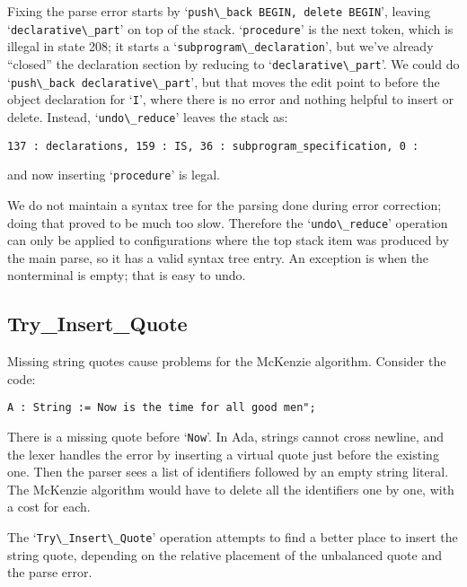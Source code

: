 \documentclass[authordraft]{acmart}
\newcommand{\code}[1]{`\lstinline|#1|'}
\begin{document}
Fixing the parse error starts by \code{push\_back BEGIN, delete BEGIN},
leaving \code{declarative\_part} on top of the stack. \code{procedure}
is the next token, which is illegal in state 208; it starts a
\code{subprogram\_declaration}, but we've already ``closed'' the
declaration section by reducing to \code{declarative\_part}. We could
do \code{push\_back declarative\_part}, but that moves the edit point to
before the object declaration for \code{I}, where there is no error
and nothing helpful to insert or delete. Instead, \code{undo\_reduce}
leaves the stack as:

\begin{verbatim}
137 : declarations, 159 : IS, 36 : subprogram_specification, 0 :
\end{verbatim}
and now inserting \code{procedure} is legal.

We do not maintain a syntax tree for the parsing done during error
correction; doing that proved to be much too slow. Therefore the
\code{undo\_reduce} operation can only be applied to configurations
where the top stack item was produced by the main parse, so it has a
valid syntax tree entry. An exception is when the nonterminal is
empty; that is easy to undo.

\subsection{Try\_Insert\_Quote}
Missing string quotes cause problems for the McKenzie algorithm.
Consider the code:
\begin{lstlisting}
A : String := Now is the time for all good men";
\end{lstlisting}
There is a missing quote before \code{Now}. In Ada, strings cannot
cross newline, and the lexer handles the error by inserting a virtual
quote just before the existing one. Then the parser sees a list of
identifiers followed by an empty string literal. The McKenzie
algorithm would have to delete all the identifiers one by one, with a
cost for each.

The \code{Try\_Insert\_Quote} operation attempts to find a better
place to insert the string quote, depending on the relative placement
of the unbalanced quote and the parse error.
\end{document}

